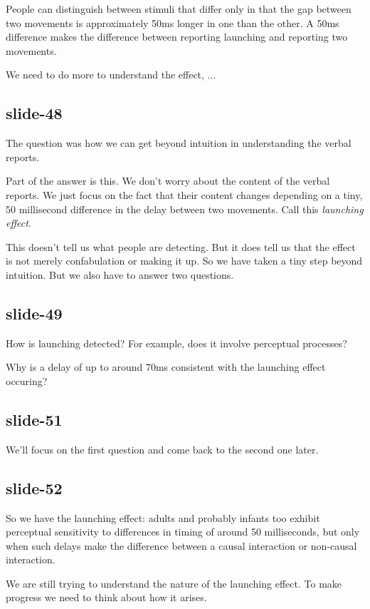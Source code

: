\documentclass[12pt,\papersize]{extarticle}
\begin{document}
People can distinguish between stimuli that differ only in that the gap between two movements
is approximately 50ms longer in one than the other.
A 50ms difference makes the difference between reporting launching and reporting two movements.
 
We need to do more to understand the effect, ...
 
\subsection{slide-48}
The question was how we can get beyond intuition in understanding the verbal reports.
 
Part of the answer is this.  We don't worry about the content of the verbal reports.
We just focus on the fact that their content changes depending on a tiny, 50 millisecond
difference in the delay between two movements.
Call this \emph{launching effect}.
 
This doesn't tell us what people are detecting.
But it does tell us that the effect is not merely confabulation or making it up.
So we have taken a tiny step beyond intuition.  But we also have to answer two questions.
 
\subsection{slide-49}
How is launching detected?  For example, does it involve perceptual processes?

            
Why is a delay of up to around 70ms consistent with the launching effect occuring?
 
 
\subsection{slide-51}
We'll focus on the first question and come back to the second one later.
 
\subsection{slide-52}
So we have the launching effect: adults and probably infants too exhibit perceptual sensitivity 
to differences in timing of around 50 milliseconds, but only when such delays make the difference
between a causal interaction or non-causal interaction.
 
We are still trying to understand the nature of the launching effect.
To make progress we need to think about how it arises.
 
\end{document}
